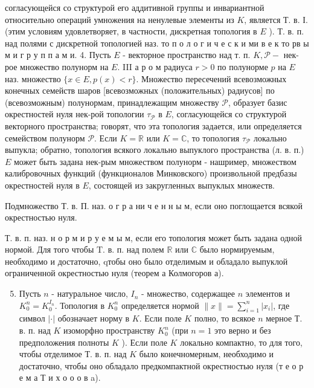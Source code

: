 \documentclass[10pt]{article}
\begin{document}
согласующейся со структурой его аддитивной группы и инвариантной относительно операций умножения на ненулевые элементы из $K$, является Т. в. І. (этим условиям удовлетворяет, в частности, дискретная топология в $E$ ). Т. в. п. над полями с дискретной топологией наз. то п о л о г и ч е с к и ми в е к то рв ы м и г р у п п а м и. 4. Пусть $E$ - векторное пространство над т. п. $K, \mathscr{P}-$ нек-рое множество полунорм на $E$. III а р о м радиуса $r>0$ по полунорме $p$ на $E$ наз. множество $\{x \in E, p(x)<r\}$. Множество пересечений всевозможных конечных семейств шаров [всевозможных (положительных) радиусов] по (всевозможным) полунормам, принадлежащим множеству $\mathscr{P}$, образует базис окрестностей нуля нек-рой топологии $\tau_{\mathscr{P}}$ в $E$, согласующейся со структурой векторного пространства; говорят, что эта топология задается, или определяется семейством полунорм $\mathscr{P}$. Если $K=\mathbb{R}$ или $K=\mathbb{C}$, то топология $\tau_{\mathscr{P}}$ локально выпукла; обратно, топология всякого локально выпуклого пространства (л. в. п.) $E$ может быть задана нек-рым множеством полунорм - нашример, множеством калибровочных функций (функционалов Минковского) произвольной предбазы окрестностей нуля в $E$, состоящей из закругленных выпуклых множеств.



Подмножество Т. в. П. наз. о г р а ни ч е н н ы м, если оно поглощается всякой окрестностью нуля.



Т. в. п. наз. н о р м и р у е м ы м, если его топология может быть задана одной нормой. Для того чтобы T. в. п. над полем $\mathbb{R}$ или $\mathbb{C}$ было нормируемым, необходимо и достаточно, qтобы оно было отделимым и обладало выпуклой ограниченной окрестностью нуля (теорем а Колмогоров а).



\begin{enumerate}

  \setcounter{enumi}{4}

  \item Пусть $n$ - натуральное число, $I_{n}$ - множество, содержащее $n$ элементов и $K_{0}^{n}=K_{0}^{I_{n}}$. Топология в $K_{0}^{n}$ определяется нормой $\|x\|=\sum_{i=1}^{n}\left|x_{i}\right|$, где символ $|\cdot|$ обозначает норму в $K$. Если поле $K$ полно, то всякое $n$ мерное Т. в. п. над $K$ изоморфно пространству $K_{0}^{n}$ (при $n=1$ это верно и без предположения полноты $K$ ). Если поле $K$ локально компактно, то для того, чтобы отделимое Т. в. п. над $K$ было конечномерным, необходимо и достаточно, чтобы оно обладало предкомпактной окрестностью нуля (т е о р е м а Т и х о о о в a).

\end{enumerate}
\end{document}
